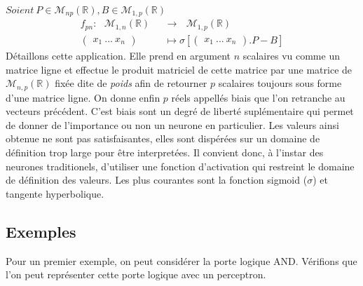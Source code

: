 \documentclass[12pt]{article}
\begin{document}
\begin{math}
Soient \ P \in \mathcal{M}_{np}(\mathds{R}), B \in \mathcal{M}_{1,p}(\mathds{R})
\end{math}
\begin{align*}
f_{pn}: \ \ \ \mathcal{M}_{1,n}(\mathds{R}) \ \ \ &\longrightarrow \ \ \ \mathcal{M}_{1,p}(\mathds{R}) \\
  \begin{pmatrix}
	{x_1 \ ... \ x_n}
\end{pmatrix} &\longmapsto
\sigma \left[
\begin{pmatrix}
	{x_1 \ ... \ x_n}
\end{pmatrix} . 
P - B \right]
\end{align*}
Détaillons cette application. Elle prend en argument $n$ scalaires vu comme un matrice ligne et effectue le produit matriciel de cette matrice par une matrice de $\mathcal{M}_{n,p}(\mathds{R})$ fixée dite de \textit{poids} afin de retourner $p$ scalaires toujours sous forme d'une matrice ligne. On donne enfin $p$ réels appellés biais que l'on retranche au vecteurs précédent. C'est biais sont un degré de liberté suplémentaire qui permet de donner de l'importance ou non un neurone en particulier.
Les valeurs ainsi obtenue ne sont pas satisfaisantes, elles sont dispérées sur un domaine de définition trop large pour être interpretées. Il convient donc, à l'instar des neurones traditionels, d'utiliser une fonction d'activation qui restreint le domaine de définition des valeurs. Les plus courantes sont la fonction sigmoid ($\sigma$) et tangente hyperbolique. 

\iffalse
On définit la fonction sigmoid:

\begin{align*}
\sigma : x  \longmapsto \frac{1}{1 + e^{-x}}
\end{align*}
\fi

\subsection{Exemples}\label{subsection: \thesubsection}

Pour un premier exemple, on peut considérer la porte logique AND. Vérifions que l'on peut représenter cette porte logique avec un perceptron. 
\end{document}
